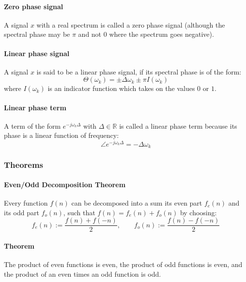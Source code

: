\paragraph{Zero phase signal}
A signal $x$ with a real spectrum is called a zero phase signal (although the spectral phase may be $\pi$ and not $0$ where the spectrum goes negative).

\paragraph{Linear phase signal}
A signal $x$ is said to be a linear phase signal, if its spectral phase is of the form:
\begin{equation}
  \Theta(\omega_k) = \pm \Delta \omega_k \pm \pi I(\omega_k)
\end{equation}
where $I(\omega_k)$ is an indicator function which takes on the values $0$ or $1$.

\paragraph{Linear phase term}
A term of the form $e^{-j \omega_k \Delta}$ with $\Delta \in \mathbb{R}$ is called a linear phase term because its phase is a linear function of frequency:
\begin{equation}
  \angle e^{-j \omega_k \Delta} = - \Delta \omega_k
\end{equation}


\subsubsection{Theorems}

\paragraph{Even/Odd Decomposition Theorem}
Every function $f(n)$ can be decomposed into a sum its even part $f_e(n)$ and its odd part $f_o(n)$, such that $f(n) = f_e(n) + f_o(n)$ by choosing:
\begin{equation}
  f_e(n) :=  \frac{f(n) + f(-n)}{2}, \qquad f_o(n) :=  \frac{f(n) - f(-n)}{2}   
\end{equation}

\paragraph{Theorem}
The product of even functions is even, the product of odd functions is even, and the product of an even times an odd function is odd.

